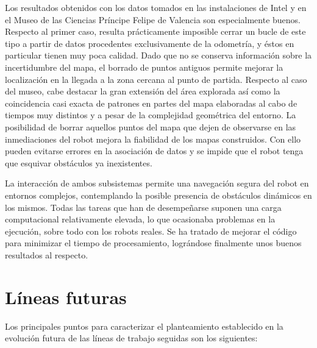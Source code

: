 \begin{itemize}
  Los resultados obtenidos con los datos tomados en las instalaciones de Intel y en el Museo de las Ciencias Príncipe Felipe de Valencia son especialmente buenos. Respecto al primer caso, resulta prácticamente imposible cerrar un bucle de este tipo a partir de datos procedentes exclusivamente de la odometría, y éstos en particular tienen muy poca calidad. Dado que no se conserva información sobre la incertidumbre del mapa, el borrado de puntos antiguos permite mejorar la localización en la llegada a la zona cercana al punto de partida. Respecto al caso del museo, cabe destacar la gran extensión del área explorada así como la coincidencia casi exacta de patrones en partes del mapa elaboradas al cabo de tiempos muy distintos y a pesar de la complejidad geométrica del entorno. La posibilidad de borrar aquellos puntos del mapa que dejen de observarse en las inmediaciones del robot mejora la fiabilidad de los mapas construidos. Con ello pueden evitarse errores en la asociación de datos y se impide que el robot tenga que esquivar obstáculos ya inexistentes.

\end{itemize}

La interacción de ambos subsistemas permite una navegación segura del robot en entornos complejos, contemplando la posible presencia de obstáculos dinámicos en los mismos. Todas las tareas que han de desempeñarse suponen una carga computacional relativamente elevada, lo que ocasionaba problemas en la ejecución, sobre todo con los robots reales. Se ha tratado de mejorar el código para minimizar el tiempo de procesamiento, lográndose finalmente unos buenos resultados al respecto.

\section{Líneas futuras}
Los principales puntos para caracterizar el planteamiento establecido en la evolución futura de las líneas de trabajo seguidas son los siguientes:

